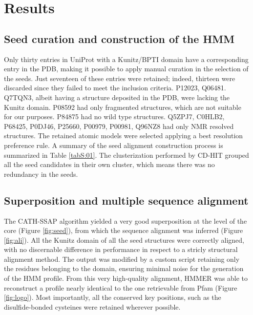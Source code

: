 \documentclass[nocrop]{bioinfo}
\begin{document}
\section{Results} 
\subsection{Seed curation and construction of the HMM}
Only thirty entries in UniProt with a Kunitz/BPTI domain have a corresponding entry in the PDB, making it possible to apply manual curation in the selection of the seeds.
Just seventeen of these entries were retained; indeed, thirteen were discarded since they failed to meet the inclusion criteria.
P12023, Q06481. Q7TQN3, albeit having a structure deposited in the PDB, were lacking the Kunitz domain.
P08592 had only fragmented structures, which are not suitable for our purposes.
P84875 had no wild type structures.
Q5ZPJ7, C0HLB2, P68425, P0DJ46, P25660, P00979, P00981, Q96NZ8 had only NMR resolved structures.
The retained atomic models were selected applying a best resolution preference rule.
A summary of the seed alignment construction process is summarized in Table \ref{tabS:01}.
The clusterization performed by CD-HIT grouped all the seed candidates in their own cluster, which means there was no redundancy in the seeds. 

\subsection{Superposition and multiple sequence alignment}
The CATH-SSAP algorithm yielded a very good superposition at the level of the core (Figure \ref{fig:seed}), from which the sequence alignment was inferred (Figure \ref{fig:ali}).
All the Kunitz domain of all the seed structures were correctly aligned, with no discernable difference in performance in respect to a stricly structural alignment method. 
The output was modified by a custom script retaining only the residues belonging to the domain, ensuring minimal noise for the generation of the HMM profile.
From this very high-quality alignment, HMMER was able to reconstruct a profile nearly identical to the one retrievable from Pfam (Figure \ref{fig:logo}).
Most importantly, all the conserved key positions, such as the disulfide-bonded cysteines were retained wherever possible.
\end{document}
